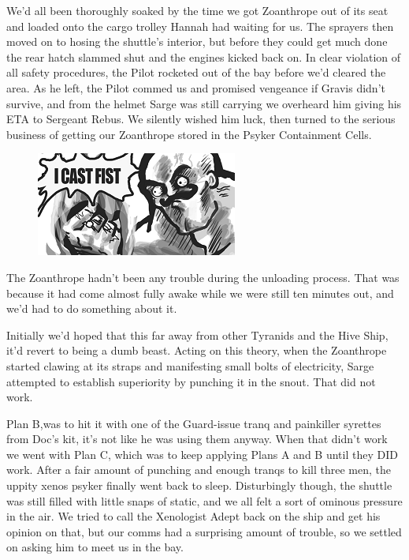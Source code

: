 We'd all been thoroughly soaked by the time we got Zoanthrope out of its seat and loaded onto the cargo trolley Hannah had waiting for us. 
The sprayers then moved on to hosing the shuttle's interior, but before they could get much done the rear hatch slammed shut and the engines kicked back on. 
In clear violation of all safety procedures, the Pilot rocketed out of the bay before we'd cleared the area. 
As he left, the Pilot commed us and promised vengeance if Gravis didn't survive, and from the helmet Sarge was still carrying we overheard him giving his ETA to Sergeant Rebus. 
We silently wished him luck, then turned to the serious business of getting our Zoanthrope stored in the Psyker Containment Cells.
\begin{figure}
	\begin{center}
		\includegraphics[width=\figwidth]{pics/12/63.png}
	\end{center}
\end{figure}
The Zoanthrope hadn't been any trouble during the unloading process. 
That was because it had come almost fully awake while we were still ten minutes out, and we'd had to do something about it. 


Initially we'd hoped that this far away from other Tyranids and the Hive Ship, it'd revert to being a dumb beast. 
Acting on this theory, when the Zoanthrope started clawing at its straps and manifesting small bolts of electricity, Sarge attempted to establish superiority by punching it in the snout. 
That did not work. 


Plan B,was to hit it with one of the Guard-issue tranq and painkiller syrettes from Doc's kit, it's not like he was using them anyway. 
When that didn't work we went with Plan C, which was to keep applying Plans A and B until they DID work. 
After a fair amount of punching and enough tranqs to kill three men, the uppity xenos psyker finally went back to sleep. 
Disturbingly though, the shuttle was still filled with little snaps of static, and we all felt a sort of ominous pressure in the air. 
We tried to call the Xenologist Adept back on the ship and get his opinion on that, but our comms had a surprising amount of trouble, so we settled on asking him to meet us in the bay.

